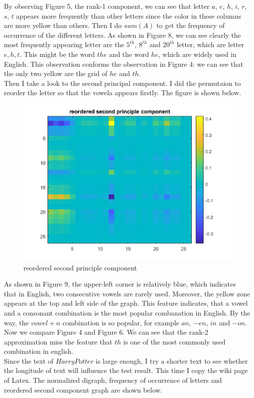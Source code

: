 \documentclass[a4paper]{article}
\begin{document}
By observing Figure 5, the rank-1 component, we can see that letter $a$, $e$, $h$, $i$, $r$, $s$, $t$ appears more frequently than other letters since the color in these columns are more yellow than others. Then I do $sum(A)$ to get the frequency of occurrence of the different letters. As shown in Figure 8, we can see clearly the most frequently appearing letter are the $5^{th}$, $8^{th}$ and $20^{th}$ letter, which are letter $e,h,t$. This might be the word $the$ and the word $he$, which are widely used in English. This observation conforms the observation in Figure 4: we can see that the only two yellow are the grid of $he$ and $th$.\\
\indent Then I take a look to the second principal component. I did the permutaion to reorder the letter so that the vowela appears firstly. The figure is shown below.

\begin{figure}[H] 
\centering 
\includegraphics[width=1.0\textwidth]{2.1-6.png}
\caption{reordered second principle component} 
\label{Fig.Fig.2.1-6} 
\end{figure}

As shown in Figure 9, the upper-left corner is relatively blue, which indicates that in English, two consecutive vowels are rarely used. Moreover, the yellow zone appears at the top and left side of the graph. This feature indicates, that a vowel and a consonant combination is the most popular combanation in English. By the way, the $vowel + n$ combination is so popular, for example $an$, $-en$, $in$ and $-on$. \\
\indent Now we compare Figure 4 and Figure 6. We can see that the rank-2 approximation miss the feature that $th$ is one of the most commonly used combination in english.\\
\indent Since the text of $Harry Potter$ is large enough, I try a shorter text to see whether the longitude of text will influence the test result. This time I copy the wiki page of Latex. The normalized digraph, frequency of occurrence of letters and reordered second component graph are shown below.
\end{document}
